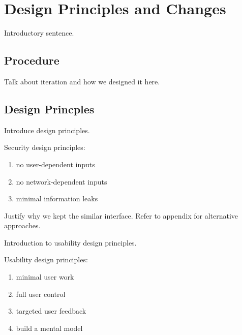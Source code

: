 \documentclass[USenglish,oneside,twocolumn]{article}
\begin{document}
\section{Design Principles and Changes}
\label{sec:design} 

{\color {blue}
Introductory sentence.
}

\subsection{Procedure} 
{\color {blue}
Talk about iteration and how we designed it here.
}

\subsection{Design Princples} 
{\color {blue}
Introduce design principles. 

Security design principles: 
\begin{enumerate}
\item no user-dependent inputs 
\item no network-dependent inputs
\item minimal information leaks
\end{enumerate} 

Justify why we kept the similar interface. Refer to appendix for alternative approaches. 

Introduction to usability design principles. 

Usability design principles: 
\begin{enumerate}
\item minimal user work
\item full user control  
\item targeted user feedback
\item build a mental model
\end{enumerate} 
}
\end{document}
